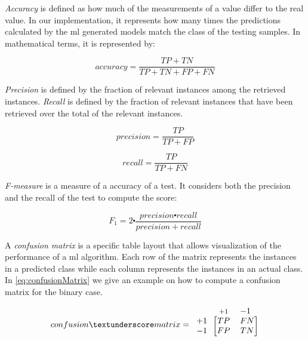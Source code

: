 \textit{Accuracy} is defined as how much of the measurements of a value differ to the real value. In our implementation, it represents how many times the predictions calculated by the \ac{ml} generated models match the class of the testing samples. In mathematical terms, it is represented by:

\begin{equation}
\label{eq:accuracy}
accuracy=\frac{TP + TN} {TP + TN + FP + FN} 
\end{equation}


\textit{Precision} is defined by the fraction of relevant instances among the retrieved instances. \textit{Recall} is defined by the fraction of relevant instances that have been retrieved over the total of the relevant instances.


\begin{equation}
\label{eq:precision}
precision=\frac{TP}{TP + FP}
\end{equation}

\begin{equation}
\label{eq:recall}
recall=\frac{TP}{TP + FN}
\end{equation}

\textit{F-measure} is a measure of a accuracy of a test. It considers both the precision and the recall of the test to compute the score:

\begin{equation}
\label{eq:f-measure}
F_1=2\centerdot \frac{precision\centerdot recall}{precision + recall}
\end{equation}


A \textit{confusion matrix} is a specific table layout that allows visualization of the performance of a \ac{ml} algorithm. Each row of the matrix represents the instances in a predicted class while each column represents the instances in an actual class. In \ref{eq:confusionMatrix} we give an example on how to compute a confusion matrix for the binary case.

\begin{equation*}
\label{eq:confusionMatrix}
  confusion\textunderscore matrix=
  \begin{blockarray}{*{2}{c} l}
    \begin{block}{*{2}{>{$\footnotesize}c<{$}} l}
      &+1 & -1  \\
    \end{block}
    \begin{block}{c [*{2}{c}]}
      +1 & TP & FN  \\
      -1 & FP & TN \\
    \end{block}
  \end{blockarray}
\end{equation*}


